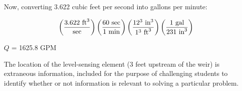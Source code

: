 \vskip 10pt

Now, converting 3.622 cubic feet per second into gallons per minute:

$$\left(3.622 \hbox{ ft}^3 \over \hbox{sec} \right) \left(60 \hbox{ sec} \over 1 \hbox{ min}\right) \left(12^3 \hbox{ in}^3 \over 1^3 \hbox{ ft}^3\right) \left(1 \hbox{ gal} \over 231 \hbox{ in}^3\right)$$

$Q$ = 1625.8 GPM

\vskip 10pt

The location of the level-sensing element (3 feet upstream of the weir) is extraneous information, included for the purpose of challenging students to identify whether or not information is relevant to solving a particular problem.




